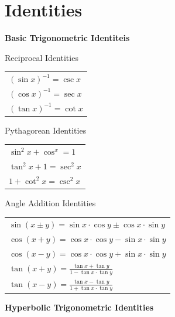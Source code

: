 \documentclass{article}
\begin{document}
\vspace{0.5cm}
\rhead{\leftmark}
\cfoot{}

\text{}

\section{Identities}
\begin{center}

\textbf{Basic Trigonometric Identiteis}

\begin{minipage}{0.3\linewidth}
Reciprocal Identities\\
\begin{tabular}{l}
$(\sin x)^{-1} = \csc x$\\
$(\cos x)^{-1} = \sec x$\\
$(\tan x)^{-1} = \cot x$
\end{tabular}
\end{minipage}
\begin{minipage}{0.3\linewidth}
Pythagorean Identities\\
\begin{tabular}{l}
$\sin^2 x + \cos^x = 1$\\
$\tan^2 x + 1 = \sec^2 x$\\
$1 + \cot^2 x = \csc^2 x$
\end{tabular}
\end{minipage}
\begin{minipage}{0.3\linewidth}
Angle Addition Identities\\
\begin{tabular}{l}
$\sin(x \pm y) = \sin x \cdot \cos y \pm \cos x \cdot \sin y$\\
$\cos(x + y) = \cos x \cdot \cos y - \sin x \cdot \sin y$\\
$\cos(x - y) = \cos x \cdot \cos y + \sin x \cdot \sin y$\\
$\tan(x + y) = \displaystyle\frac{\tan x + \tan y}{1 - \tan x \cdot \tan y}$\\
$\tan(x - y) = \displaystyle\frac{\tan x - \tan y}{1 + \tan x \cdot \tan y}$
\end{tabular}
\end{minipage}

\vspace{0.5cm}

\textbf{Hyperbolic Trigonometric Identities}

\vspace{0.3cm}


\end{center}
\end{document}
